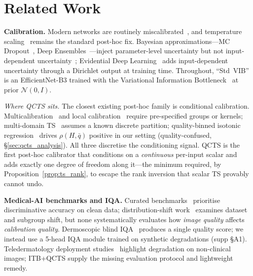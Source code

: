 \documentclass{bmvc2k}
\newcommand{\qbar}{\bar{q}}
\begin{document}
\section{Related Work}

\textbf{Calibration.}
Modern networks are routinely miscalibrated~\cite{guo2017calibration}, and temperature scaling~\cite{guo2017calibration} remains the standard post-hoc fix. Bayesian approximations---MC Dropout~\cite{gal2016dropout}, Deep Ensembles~\cite{lakshminarayanan2017ensemble,ovadia2019uncertainty}---inject parameter-level uncertainty but not input-dependent uncertainty~\cite{malinin2019predictive}; Evidential Deep Learning~\cite{sensoy2018evidential} adds input-dependent uncertainty through a Dirichlet output at training time. Throughout, ``Std~VIB'' is an EfficientNet-B3 trained with the Variational Information Bottleneck~\cite{alemi2017vib} at prior $\mathcal{N}(0,I)$.

\emph{Where QCTS sits.} The closest existing post-hoc family is conditional calibration. Multicalibration~\cite{hebert2018multicalibration,deng2023happymap} and local calibration~\cite{luo2023local} require pre-specified groups or kernels; multi-domain TS~\cite{yu2022robust} assumes a known discrete partition; quality-binned isotonic regression~\cite{zadrozny2002transforming} drives $\rho(H,\qbar)$ positive in our setting (quality-confused, \S\ref{sec:qcts_analysis}). All three discretise the conditioning signal. QCTS is the first post-hoc calibrator that conditions on a \emph{continuous} per-input scalar and adds exactly one degree of freedom along it---the minimum required, by Proposition~\ref{prop:ts_rank}, to escape the rank inversion that scalar TS provably cannot undo.

\textbf{Medical-AI benchmarks and IQA.}
Curated benchmarks~\cite{irvin2019chexpert,johnson2019mimic,menze2014multimodal,codella2018skin} prioritise discriminative accuracy on clean data; distribution-shift work~\cite{koh2021wilds,subbaswamy2021evaluating,seyyed2021underdiagnosis} examines dataset and subgroup shift, but none systematically evaluates how \emph{image quality} affects \emph{calibration quality}. Dermoscopic blind IQA~\cite{barata2023quality,park2023quality} produces a single quality score; we instead use a 5-head IQA module trained on synthetic degradations (supp \S A1). Teledermatology deployment studies~\cite{esteva2017dermatologist,tschandl2020human,winkler2022dermoscopy,liu2020deep} highlight degradation on non-clinical images; ITB+QCTS supply the missing evaluation protocol and lightweight remedy.
\end{document}
